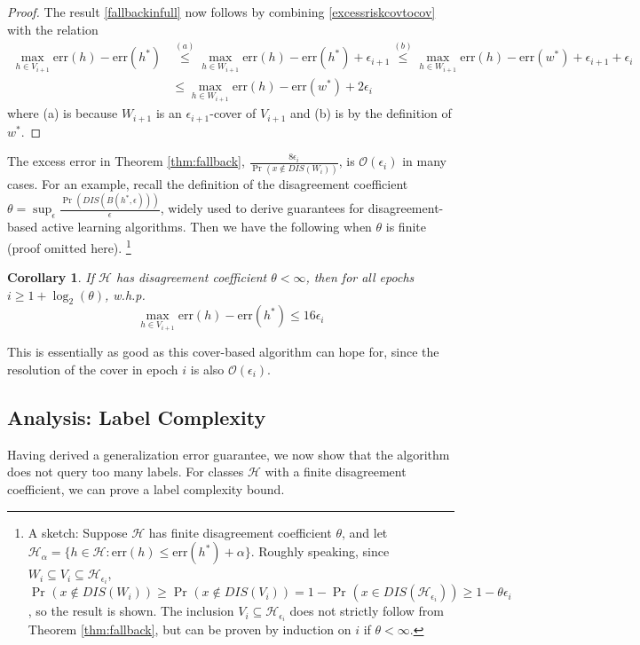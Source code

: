\documentclass{article}[12pt]
\newtheorem{cor}[thm]{Corollary}
\theoremstyle{named}
\DeclareMathOperator{\Prtxt}{Pr}
\newcommand{\prp}[2]{\Prtxt_{#2} \left(#1\right)}
\newcommand{\err}[1]{\mbox{err}\left(#1\right)}
\newcommand{\cH}{\mathcal{H}}
\newcommand{\cO}[1]{\mathcal{O}\left(#1\right)}
\begin{document}
\begin{proof}
The result \eqref{fallbackinfull} now follows by combining \eqref{excessriskcovtocov} 
with the relation
\begin{align*}
\max_{h \in V_{i+1}} \err{h} - \err{h^*} &\stackrel{(a)}{\leq} \max_{h \in W_{i+1}} \err{h} - \err{h^*} + \epsilon_{i+1}
\stackrel{(b)}{\leq} \max_{h \in W_{i+1}} \err{h} - \err{w^*} + \epsilon_{i+1} + \epsilon_i \\
&\leq \max_{h \in W_{i+1}} \err{h} - \err{w^*} + 2 \epsilon_i 
\end{align*}
where (a) is because $W_{i+1}$ is an $\epsilon_{i+1}$-cover of $V_{i+1}$ 
and (b) is by the definition of $w^*$.
\end{proof}

The excess error in Theorem \ref{thm:fallback}, 
$\frac{8 \epsilon_i}{\prp{x \notin DIS(W_i)}{}}$, is $\cO{\epsilon_i}$ in many cases.
For an example, recall the definition of the disagreement coefficient 
$ \theta = \sup_{\epsilon} \frac{\prp{DIS(B(h^*, \epsilon))}{}}{\epsilon}$, 
widely used to derive guarantees for disagreement-based active learning algorithms. 
Then we have the following when $\theta$ is finite (proof omitted here).
\footnote{A sketch: Suppose $\cH$ has finite disagreement coefficient $\theta$, 
and let $\cH_{\alpha} = \{ h \in \cH : \err{h} \leq \err{h^*} + \alpha \}$. 
Roughly speaking, since $W_i \subseteq V_i \subseteq \cH_{\epsilon_i}$, 
$\prp{x \notin DIS(W_i)}{} \geq \prp{x \notin DIS(V_i)}{} = 1 - \prp{x \in DIS(\cH_{\epsilon_i})}{} 
\geq 1 - \theta \epsilon_i $, 
so the result is shown. 
The inclusion $V_i \subseteq \cH_{\epsilon_i}$ does not strictly follow from Theorem \ref{thm:fallback}, 
but can be proven by induction on $i$ if $\theta < \infty$.}

\begin{cor}
\label{cor:fallbackdiscoeff}
If $\cH$ has disagreement coefficient $\theta < \infty$, then for all epochs $i \geq 1 + \log_2 (\theta)$, w.h.p.
$$ \max_{h \in V_{i+1}} \err{h} - \err{h^*} \leq 16 \epsilon_i $$
\end{cor}
  
This is essentially as good as this cover-based algorithm can hope for, 
since the resolution of the cover in epoch $i$ is also $\cO{\epsilon_i}$. 


\subsection{Analysis: Label Complexity}
\label{sec:labelanalysis}

Having derived a generalization error guarantee, 
we now show that the algorithm does not query too many labels. 
For classes $\cH$ with a finite disagreement coefficient, we can prove a label complexity bound. 
\end{document}
